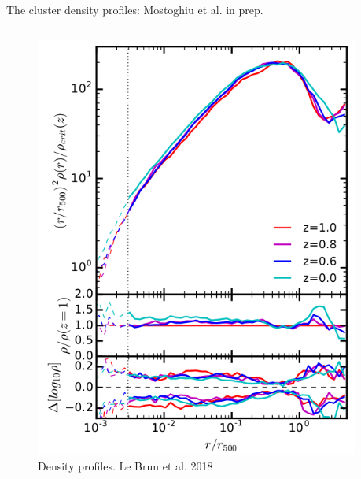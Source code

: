 \documentclass[aspectratio=43]{beamer}
\begin{document}
\begin{frame}{The cluster density profiles: Mostoghiu et al. in prep.}
  \begin{columns}[t]
    \begin{column}{0.3\textwidth}
      \begin{figure}
        \includegraphics[width=\linewidth]{LeBrun18}
        \caption{Density profiles. Le Brun et al. 2018}
      \end{figure}
    \end{column}
    \begin{column}{0.7\textwidth}
\end{column}
\end{columns}
\end{frame}
\end{document}
